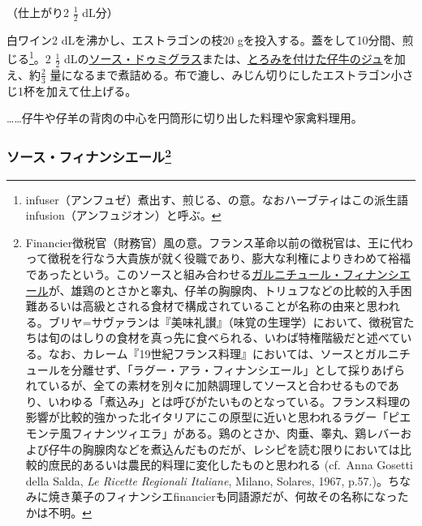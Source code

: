 \begin{recette}


（仕上がり2 \(\frac{1}{2}\) dL分）

白ワイン2 dLを沸かし、エストラゴンの枝20
gを投入する。蓋をして10分間、煎じる\footnote{infuser（アンフュゼ）煮出す、煎じる、の意。なおハーブティはこの派生語infusion（アンフュジオン）と呼ぶ。}。2
\(\frac{1}{2}\)
dLの\protect\hyperlink{sauce-demi-glace}{ソース・ドゥミグラス}または、\protect\hyperlink{jus-de-veau-lie}{とろみを付けた仔牛のジュ}を加え、約\(\frac{2}{3}\)
量になるまで煮詰める。布で漉し、みじん切りにしたエストラゴン小さじ1杯を加えて仕上げる。

\ldots{}\ldots{}仔牛や仔羊の背肉の中心を円筒形に切り出した料理や家禽料理用。

\hypertarget{sauce-financiere}{%
\subsubsection[ソース・フィナンシエール]{\texorpdfstring{ソース・フィナンシエール\footnote{Financier徴税官（財務官）風の意。フランス革命以前の徴税官は、王に代わって徴税を行なう大貴族が就く役職であり、膨大な利権によりきわめて裕福であったという。このソースと組み合わせる\protect\hyperlink{garniture-a-la-financiere}{ガルニチュール・フィナンシエール}が、雄鶏のとさかと睾丸、仔羊の胸腺肉、トリュフなどの比較的入手困難あるいは高級とされる食材で構成されていることが名称の由来と思われる。ブリヤ=サヴァランは『美味礼讃』（味覚の生理学）において、徴税官たちは旬のはしりの食材を真っ先に食べられる、いわば特権階級だと述べている。なお、カレーム『19世紀フランス料理』においては、ソースとガルニチュールを分離せず、「ラグー・アラ・フィナンシエール」として採りあげられているが、全ての素材を別々に加熱調理してソースと合わせるものであり、いわゆる「煮込み」とは呼びがたいものとなっている。フランス料理の影響が比較的強かった北イタリアにこの原型に近いと思われるラグー「ピエモンテ風フィナンツィエラ」がある。鶏のとさか、肉垂、睾丸、鶏レバーおよび仔牛の胸腺肉などを煮込んだものだが、レシピを読む限りにおいては比較的庶民的あるいは農民的料理に変化したものと思われる
  (cf.~Anna Gosetti della Salda, \emph{Le Ricette Regionali Italiane},
  Milano, Solares, 1967,
  p.57.)。ちなみに焼き菓子のフィナンシエfinancierも同語源だが、何故その名称になったかは不明。}}{ソース・フィナンシエール}}\label{sauce-financiere}}


\end{recette}
